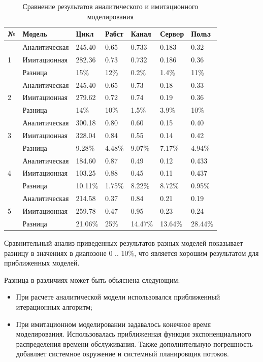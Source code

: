 \documentclass[russian,utf8,emptystyle]{eskdtext}
\begin{document}
\begin{longtable}{p{0.5cm}|p{4cm}|p{1.5cm}|p{1.5cm}|p{1.5cm}|p{1.5cm}|p{1.5cm}}
\caption{Сравнение результатов аналитического и имитационного моделирования}
\label{tab:model-cmp} \\
 №                 & Модель           & Цикл   & Рабст & Канал & Сервeр & Польз \\
\hline
\multirow{3}{*}{1} & Аналитическая    & 245.40 & 0.65  & 0.733 & 0.183  & 0.32  \\
                   & Имитационная     & 282.36 & 0.73  & 0.732 & 0.186  & 0.36  \\
                   & Разница          & 15\%   & 12\%  & 0.2\% & 1.4\%  & 11\%  \\
\hline
\multirow{3}{*}{2} & Аналитическая    & 245.40 & 0.65  & 0.73  & 0.18   & 0.33  \\
                   & Имитационная     & 279.62 & 0.72  & 0.74  & 0.19   & 0.36  \\
               	   & Разница          & 14\%   & 10\%  & 1.5\% & 3.9\%  & 10\%  \\
\hline
\multirow{3}{*}{3} & Аналитическая    & 300.18 & 0.80  & 0.60  & 0.15   & 0.40  \\
                   & Имитационная    & 328.04 & 0.84  & 0.55  & 0.14   & 0.42  \\
                   & Разница          & 9.28\% & 4.48\%& 9.07\%& 7.17\% & 4.94\%\\
\hline
\multirow{3}{*}{4} & Аналитическая    & 184.60 & 0.87  & 0.49  & 0.12   & 0.433 \\
                   & Имитационная     & 103.25 & 0.88  & 0.45  & 0.11   & 0.437 \\
                   & Разница          & 10.11\%&1.75\% & 8.22\%& 8.72\% & 0.95\%\\
\hline
\multirow{3}{*}{5} & Аналитическая    & 214.58 & 0.37  & 0.84   & 0.21   & 0.19  \\
                   & Имитационная     & 259.78 & 0.47  & 0.95   & 0.23   & 0.24  \\
                   & Разница          & 21.06\%& 25\%  & 14.47\%& 13.64\%& 28.44\%\\
\end{longtable}

Сравнительный анализ приведенных результатов разных моделей показывает разницу в значениях в диапозоне 0 .. 10\%, что является хорошим результатом для приближенных моделей. 

Разница в различиях может быть объяснена следующим:
\begin{itemize}[label=-]
\item При расчете аналитической модели использовался приближенный итерационных алгоритм;
\item При имитационном моделировании задавалось конечное время моделирования. Использовалась приближенная функция экспоненциального распределения времени обслуживания. Также дополнительную погрешность добавляет системное окружение и системный планировщик потоков.
\end{itemize}
\end{document}
